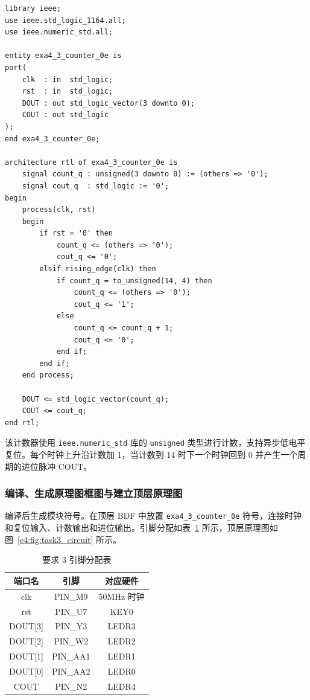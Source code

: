 \documentclass{ctexrep}
\begin{document}
\begin{verbatim}
library ieee;
use ieee.std_logic_1164.all;
use ieee.numeric_std.all;

entity exa4_3_counter_0e is
port(
    clk  : in  std_logic;
    rst  : in  std_logic;
    DOUT : out std_logic_vector(3 downto 0);
    COUT : out std_logic
);
end exa4_3_counter_0e;

architecture rtl of exa4_3_counter_0e is
    signal count_q : unsigned(3 downto 0) := (others => '0');
    signal cout_q  : std_logic := '0';
begin
    process(clk, rst)
    begin
        if rst = '0' then
            count_q <= (others => '0');
            cout_q <= '0';
        elsif rising_edge(clk) then
            if count_q = to_unsigned(14, 4) then
                count_q <= (others => '0');
                cout_q <= '1';
            else
                count_q <= count_q + 1;
                cout_q <= '0';
            end if;
        end if;
    end process;

    DOUT <= std_logic_vector(count_q);
    COUT <= cout_q;
end rtl;
\end{verbatim}
\label{e4:lst:counter}

该计数器使用 \texttt{ieee.numeric\_std} 库的 \texttt{unsigned} 类型进行计数，支持异步低电平复位。每个时钟上升沿计数加 1，当计数到 14 时下一个时钟回到 0 并产生一个周期的进位脉冲 COUT。

\subsubsection{编译、生成原理图框图与建立顶层原理图}

编译后生成模块符号。在顶层 BDF 中放置 \texttt{exa4\_3\_counter\_0e} 符号，连接时钟和复位输入、计数输出和进位输出。引脚分配如表~\ref{e4:tab:task3_pins} 所示，顶层原理图如图~\ref{e4:fig:task3_circuit} 所示。

\begin{table}[H]
    \centering
    \caption{要求 3 引脚分配表}
    \label{e4:tab:task3_pins}
    \begin{tabular}{ccc}
        \toprule
        \textbf{端口名} & \textbf{引脚} & \textbf{对应硬件} \\
        \midrule
        clk     & PIN\_M9  & 50MHz 时钟 \\
        rst     & PIN\_U7  & KEY0 \\
        DOUT[3] & PIN\_Y3  & LEDR3 \\
        DOUT[2] & PIN\_W2  & LEDR2 \\
        DOUT[1] & PIN\_AA1 & LEDR1 \\
        DOUT[0] & PIN\_AA2 & LEDR0 \\
        COUT    & PIN\_N2  & LEDR4 \\
        \bottomrule
    \end{tabular}
\end{table}
\end{document}
